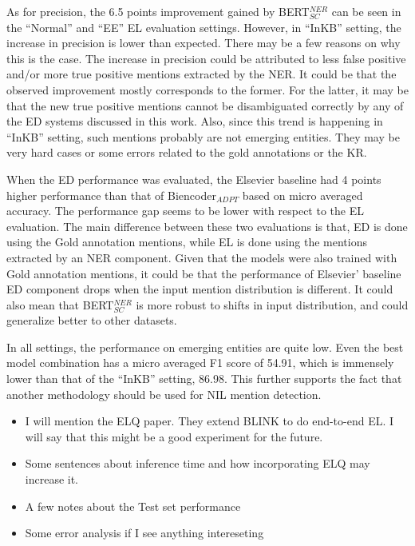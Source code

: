 \documentclass{report}
\theoremstyle{definition}
\theoremstyle{remark}
\begin{document}
As for precision, the 6.5 points improvement gained by BERT$_{SC}^{NER}$ can be seen in the ``Normal'' and ``EE'' EL evaluation settings. However, in ``InKB'' setting, the increase in precision is lower than expected. There may be a few reasons on why this is the case. The increase in precision could be attributed to less false positive and/or more true positive mentions extracted by the NER. It could be that the observed improvement mostly corresponds to the former. For the latter, it may be that the new true positive mentions cannot be disambiguated correctly by any of the ED systems discussed in this work. Also, since this trend is happening in ``InKB'' setting, such mentions probably are not emerging entities. They may be very hard cases or some errors related to the gold annotations or the KR.

When the ED performance was evaluated, the Elsevier baseline had 4 points higher performance than that of Biencoder$_{ADPT}$ based on micro averaged accuracy. The performance gap seems to be lower with respect to the EL evaluation. The main difference between these two evaluations is that, ED is done using the Gold annotation mentions, while EL is done using the mentions extracted by an NER component. Given that the models were also trained with Gold annotation mentions, it could be that the performance of Elsevier' baseline ED component drops when the input mention distribution is different. It could also mean that BERT$^{NER}_{SC}$ is more robust to shifts in input distribution, and could generalize better to other datasets.

In all settings, the performance on emerging entities are quite low. Even the best model combination has a micro averaged F1 score of 54.91, which is immensely lower than that of the ``InKB'' setting, 86.98. This further supports the fact that another methodology should be used for NIL mention detection.


\begin{itemize}
    \item I will mention the ELQ paper. They extend BLINK to do end-to-end EL. I will say that this might be a good experiment for the future.
    \item Some sentences about inference time and how incorporating ELQ may increase it.
    \item A few notes about the Test set performance
    \item Some error analysis if I see anything intereseting
\end{itemize}
\end{document}
